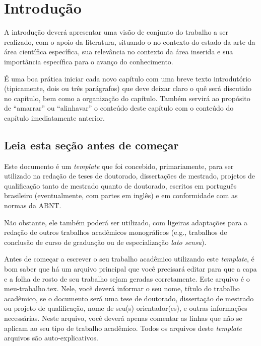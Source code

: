 
\chapter{Introdução}
\label{chap_introducao}

A introdução deverá apresentar uma visão de conjunto do trabalho a ser realizado, com o apoio da literatura, situando-o no contexto do estado da arte da área científica específica, sua relevância no contexto da área inserida e sua importância específica para o avanço do conhecimento.

É uma boa prática iniciar cada novo capítulo com uma breve texto introdutório (tipicamente, dois ou três parágrafos) que deve deixar claro o quê será discutido no capítulo, bem como a organização do capítulo.
Também servirá ao propósito de ``amarrar'' ou ``alinhavar'' o conteúdo deste capítulo com o conteúdo do capítulo imediatamente anterior.

\section{Leia esta seção antes de começar}
\label{sec_leia_esta_secao_antes_de_omecar}

Este documento é um \emph{template} que foi concebido, primariamente, para ser utilizado na redação de teses de doutorado, dissertações de mestrado, projetos de qualificação tanto de mestrado quanto de doutorado, escritos em português brasileiro (eventualmente, com partes em inglês) e em conformidade com as normas da ABNT.

Não obstante, ele também poderá ser utilizado, com ligeiras adaptações para a redação de outros trabalhos acadêmicos monográficos (e.g., trabalhos de conclusão de curso de graduação ou de especialização \emph{lato sensu}).

Antes de começar a escrever o seu trabalho acadêmico utilizando este \emph{template}, é bom saber que há um arquivo principal que você precisará editar para que a capa e a folha de rosto de seu trabalho sejam geradas corretamente.
Este arquivo é o {\ttfamily meu-trabalho.tex}.
Nele, você deverá informar o seu nome, título do trabalho acadêmico, se o documento será uma tese de doutorado, dissertação de mestrado ou projeto de qualificação, nome de seu(s) orientador(es), e outras informações necessárias.
Neste arquivo, você deverá apenas comentar as linhas que não se aplicam ao seu tipo de trabalho acadêmico.
Todos os arquivos deste \emph{template} arquivos são auto-explicativos.

